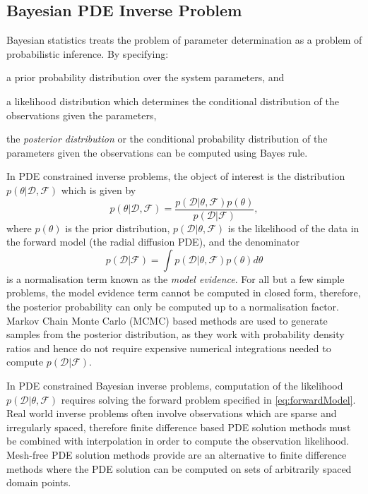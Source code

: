 \subsection{Bayesian PDE Inverse Problem}

Bayesian statistics \citep{lee1997bayesian} treats the problem of parameter determination as a 
problem of probabilistic inference. By specifying: 
\begin{enumerate*} 
  \item a prior probability distribution over the system parameters, and 
  \item a likelihood distribution which determines the conditional distribution of the observations 
        given the parameters, 
\end{enumerate*} 
the \emph{posterior distribution} or the conditional probability distribution of the parameters 
given the observations can be computed using Bayes rule.

In PDE constrained inverse problems, the object of interest is the distribution  
$p(\theta \rvert \mathcal{D}, \mathcal{F})$ which is given by 
\[
  p(\theta \rvert \mathcal{D}, \mathcal{F}) = \frac{
    p(\mathcal{D} \rvert \theta, \mathcal{F}) p(\theta)
  }{
    p(\mathcal{D}\rvert\mathcal{F})
  }, 
\]
where $p(\theta)$ is the prior distribution, $p(\mathcal{D} \rvert \theta, \mathcal{F})$ is the 
likelihood of the data in the forward model (the radial diffusion PDE), and the denominator 
\[
  p(\mathcal{D}\rvert\mathcal{F}) = \int{
    p(\mathcal{D} \rvert \theta, \mathcal{F}) p(\theta) d\theta
  }  
\] 
is a normalisation term known as the \emph{model evidence}. For all but a few simple problems, the 
model evidence term cannot be computed in closed form, therefore, the posterior probability can 
only be computed up to a normalisation factor. Markov Chain Monte Carlo (MCMC) based methods are 
used to generate samples from the posterior distribution, as they work with probability density 
ratios and hence do not require expensive numerical integrations needed to compute 
$p(\mathcal{D}\rvert\mathcal{F})$. 

In PDE constrained Bayesian inverse problems, computation of the likelihood 
$p(\mathcal{D} \rvert \theta, \mathcal{F})$ requires solving the forward problem specified in 
\cref{eq:forwardModel}. Real world inverse problems often involve observations which are sparse and 
irregularly spaced, therefore finite difference based PDE solution methods must be combined with 
interpolation in order to compute the observation likelihood. Mesh-free PDE solution methods 
provide are an alternative to finite difference methods where the PDE solution can be computed 
on sets of arbitrarily spaced domain points.

